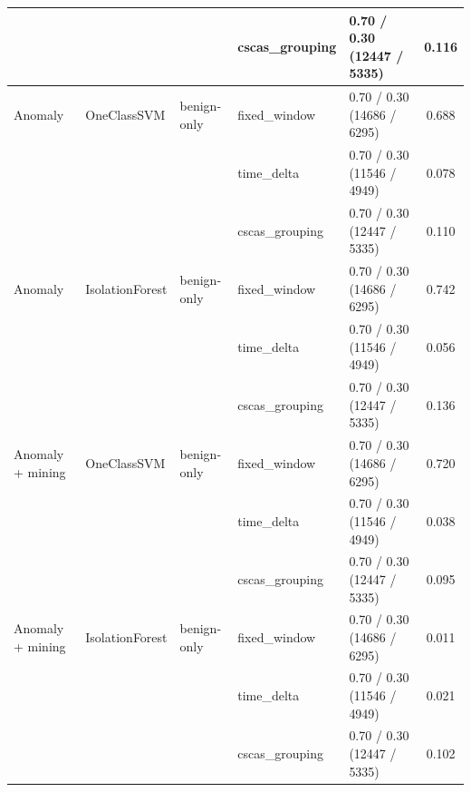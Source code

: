 \begin{table}[htbp]
{\begin{tabular}{lllllc}
 &  &  & cscas\_grouping & 0.70 / 0.30 (12447 / 5335) & 0.116 \\
\midrule
Anomaly & OneClassSVM & benign-only & fixed\_window & 0.70 / 0.30 (14686 / 6295) & 0.688 \\
 &  &  & time\_delta & 0.70 / 0.30 (11546 / 4949) & 0.078 \\
 &  &  & cscas\_grouping & 0.70 / 0.30 (12447 / 5335) & 0.110 \\
\addlinespace
Anomaly & IsolationForest & benign-only & fixed\_window & 0.70 / 0.30 (14686 / 6295) & 0.742 \\
 &  &  & time\_delta & 0.70 / 0.30 (11546 / 4949) & 0.056 \\
 &  &  & cscas\_grouping & 0.70 / 0.30 (12447 / 5335) & 0.136 \\
\addlinespace
Anomaly + mining & OneClassSVM & benign-only & fixed\_window & 0.70 / 0.30 (14686 / 6295) & 0.720 \\
 &  &  & time\_delta & 0.70 / 0.30 (11546 / 4949) & 0.038 \\
 &  &  & cscas\_grouping & 0.70 / 0.30 (12447 / 5335) & 0.095 \\
\addlinespace
Anomaly + mining & IsolationForest & benign-only & fixed\_window & 0.70 / 0.30 (14686 / 6295) & 0.011 \\
 &  &  & time\_delta & 0.70 / 0.30 (11546 / 4949) & 0.021 \\
 &  &  & cscas\_grouping & 0.70 / 0.30 (12447 / 5335) & 0.102 \\
\bottomrule
\end{tabular}%
}
\end{table}

